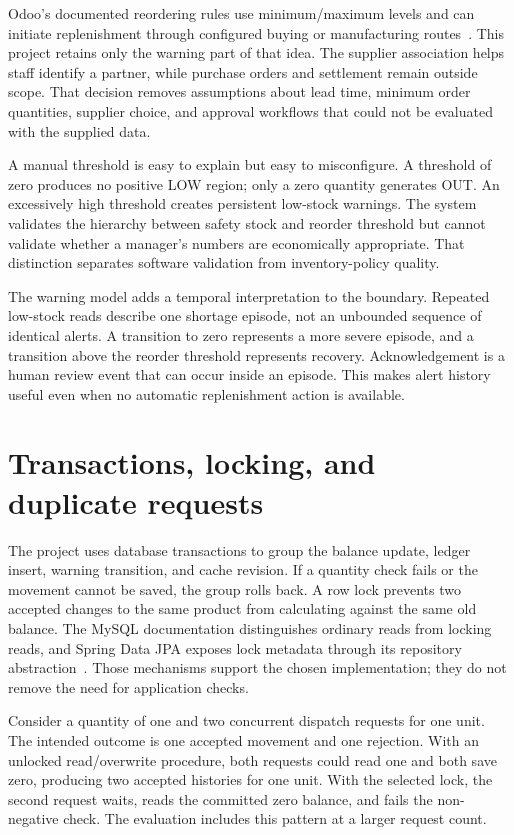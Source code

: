 Odoo's documented reordering rules use minimum/maximum levels and can initiate replenishment through configured buying or manufacturing routes~\citep{odoo}. This project retains only the warning part of that idea. The supplier association helps staff identify a partner, while purchase orders and settlement remain outside scope. That decision removes assumptions about lead time, minimum order quantities, supplier choice, and approval workflows that could not be evaluated with the supplied data.

A manual threshold is easy to explain but easy to misconfigure. A threshold of zero produces no positive LOW region; only a zero quantity generates OUT. An excessively high threshold creates persistent low-stock warnings. The system validates the hierarchy between safety stock and reorder threshold but cannot validate whether a manager's numbers are economically appropriate. That distinction separates software validation from inventory-policy quality.

The warning model adds a temporal interpretation to the boundary. Repeated low-stock reads describe one shortage episode, not an unbounded sequence of identical alerts. A transition to zero represents a more severe episode, and a transition above the reorder threshold represents recovery. Acknowledgement is a human review event that can occur inside an episode. This makes alert history useful even when no automatic replenishment action is available.

\section{Transactions, locking, and duplicate requests}
The project uses database transactions to group the balance update, ledger insert, warning transition, and cache revision. If a quantity check fails or the movement cannot be saved, the group rolls back. A row lock prevents two accepted changes to the same product from calculating against the same old balance. The MySQL documentation distinguishes ordinary reads from locking reads, and Spring Data JPA exposes lock metadata through its repository abstraction~\citep{mysql-locks,spring-locks}. Those mechanisms support the chosen implementation; they do not remove the need for application checks.

Consider a quantity of one and two concurrent dispatch requests for one unit. The intended outcome is one accepted movement and one rejection. With an unlocked read/overwrite procedure, both requests could read one and both save zero, producing two accepted histories for one unit. With the selected lock, the second request waits, reads the committed zero balance, and fails the non-negative check. The evaluation includes this pattern at a larger request count.

